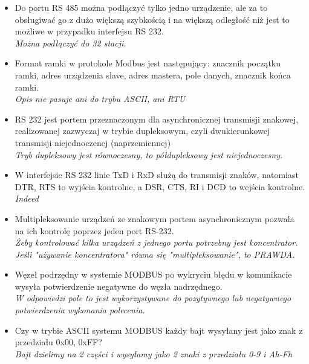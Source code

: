 \documentclass[a4paper,twoside]{article}
\begin{document}
\begin{itemize}
	\item \textcolor{nie}{Do portu RS 485 można podłączyć tylko jedno urządzenie, ale za to obsługiwać go z dużo większą szybkością i na większą odległość niż jest to możliwe w przypadku interfejsu RS 232.} \\
	{\small \emph{Można podłączyć do 32 stacji.}}
	
	\item \textcolor{nie}{Format ramki w protokole Modbus jest następujący: znacznik początku ramki, adres urządzenia slave, adres mastera, pole danych, znacznik końca ramki.} \\
	{\small \emph{Opis nie pasuje ani do trybu ASCII, ani RTU}}
	
	\item \textcolor{nie}{RS 232 jest portem przeznaczonym dla asynchronicznej transmisji znakowej, realizowanej zazwyczaj w trybie dupleksowym, czyli dwukierunkowej transmisji niejednoczenej (naprzemiennej)} \\
	{\small \emph{Tryb dupleksowy jest równoczesny, to półdupleksowy jest niejednoczesny.}}
	
	\item \textcolor{tak}{W interfejsie RS 232 linie TxD i RxD służą do transmisji znaków, natomiast DTR, RTS to wyjścia kontrolne, a DSR, CTS, RI i DCD to wejścia kontrolne.} \\
	{\small \emph{Indeed}}
	
	\item \textcolor{tak}{Multipleksowanie urządzeń ze znakowym portem asynchronicznym pozwala na ich kontrolę poprzez jeden port RS-232.} \\
	{\small \emph{Żeby kontrolować kilka urządzeń z jednego portu potrzebny jest koncentrator. Jeśli "używanie koncentratora" równa się "multipleksowanie", to PRAWDA.}}
	
	\item \textcolor{tak}{Węzeł podrzędny w systemie MODBUS po wykryciu błędu w komunikacie wysyła potwierdzenie negatywne	do węzła nadrzędnego.} \\
	{\small \emph{W odpowiedzi pole to jest wykorzystywane do pozytywnego lub negatywnego potwierdzenia wykonania polecenia.}}
	
	\item \textcolor{tak}{Czy w trybie ASCII systemu MODBUS każdy bajt wysyłany jest jako znak z przedziału 0x00, 0xFF?} \\
	{\small \emph{Bajt dzielimy na 2 części i wysyłamy jako 2 znaki z przedziału 0-9 i Ah-Fh}}
		
	
\end{itemize}
\end{document}

